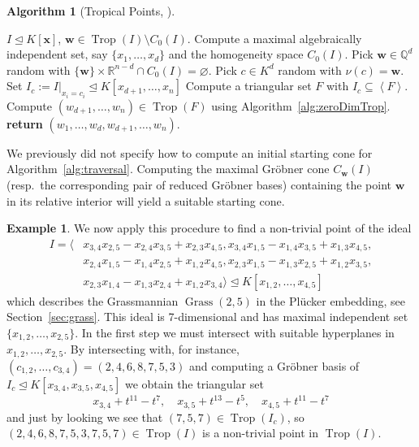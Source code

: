 \documentclass[
  paper=a4,
  titlepage,
  bibliography=totoc,
  pagesize=pdftex
]{scrartcl}
\numberwithin{figure}{section}
\numberwithin{equation}{section}
\numberwithin{table}{section}
\newcommand*\setR{\mathds{R}}
\newcommand*\setQ{\mathds{Q}}
\newcommand*\setT{\mathds{T}}
\newcommand*\ideal[1]{\left\langle #1 \right\rangle}
\let\vec\mathbf
\let\idealof\trianglelefteq
\DeclareMathOperator{\Trop}{Trop}
\DeclareMathOperator{\Grass}{Grass}
\theoremstyle{definition}
\newtheorem{example}[definition]{Example}
\newtheorem{algo}[definition]{Algorithm}
\numberwithin{definition}{section}
\begin{document}
\begin{algo}[Tropical Points, {\cite[Algorithm~3.3]{tropPointsLinks}}]\
  \begin{algorithmic}[1]
    \Require $I \idealof K[\vec x]$,
    \Ensure $\vec w \in \Trop(I) \setminus C_0(I)$.
    \State Compute a maximal algebraically independent set, say $\{x_1, \dots, x_d\}$ and
    the homogeneity space $C_0(I)$.
    \Repeat
      \State Pick $\vec w \in \setQ^d$ random with $\{\vec w\} \times \setR^{n-d} \cap
        C_0(I) = \varnothing$.
      \State Pick $c \in K^d$ random with $\nu(c) = \vec w$.
      \State Set $I_c := I|_{x_i = c_i} \idealof K[x_{d+1}, \dots, x_n]$
    \Until{$\dim(I_c) = 0$ and $V(I_c) \subseteq \setT^{n-d}$}
    \State Compute a triangular set $F$ with $I_c \subseteq \ideal F$.
    \State Compute $(w_{d+1}, \dots, w_n) \in \Trop(F)$ using
      Algorithm~\ref{alg:zeroDimTrop}.
    \State\textbf{return} $(w_1, \dots, w_d, w_{d+1}, \dots, w_n)$.
  \end{algorithmic}
  \label{alg:tropicalPoint}
\end{algo}

We previously did not specify how to compute an initial starting cone for
Algorithm~\ref{alg:traversal}. Computing the maximal Gröbner cone $C_{\vec w}(I)$ (resp.\
the corresponding pair of reduced Gröbner bases) containing the point $\vec w$ in its
relative interior will yield a suitable starting cone.

\begin{example}
  \label{ex:pointG25}
  We now apply this procedure to find a non-trivial point of the ideal
  \begin{align*}
    I = \bigl\langle
      & x_{3,4}x_{2,5}-x_{2,4}x_{3,5}+x_{2,3}x_{4,5},
        x_{3,4}x_{1,5}-x_{1,4}x_{3,5}+x_{1,3}x_{4,5}, \\
      & x_{2,4}x_{1,5}-x_{1,4}x_{2,5}+x_{1,2}x_{4,5},
        x_{2,3}x_{1,5}-x_{1,3}x_{2,5}+x_{1,2}x_{3,5}, \\
      & x_{2,3}x_{1,4}-x_{1,3}x_{2,4}+x_{1,2}x_{3,4}
    \bigr\rangle \idealof K[x_{1,2}, \dots, x_{4,5}]
  \end{align*}
  which describes the Grassmannian $\Grass(2,5)$ in the Plücker embedding, see
  Section~\ref{sec:grass}. This ideal is 7-dimensional and has maximal independent set
  $\{x_{1,2}, \dots, x_{2,5} \}$. In the first step we must intersect with suitable
  hyperplanes in $x_{1, 2}, \dots, x_{2,5}$. By intersecting with, for instance,
  $(c_{1,2}, \dots, c_{3,4}) = (2,4,6,8,7,5,3)$ and computing a Gröbner basis of $I_c
  \idealof K[x_{3,4},x_{3,5},x_{4,5}]$ we obtain the triangular set
  \[
    x_{3,4} + t^{11} - t^{7},\quad
    x_{3,5} + t^{13} - t^{5},\quad
    x_{4,5} + t^{11} - t^{7}
  \]
  and just by looking we see that $(7,5,7) \in \Trop(I_c)$, so $(2,4,6,8,7,5,3,7,5,7) \in
  \Trop(I)$ is a non-trivial point in $\Trop(I)$.
\end{example}
\end{document}
